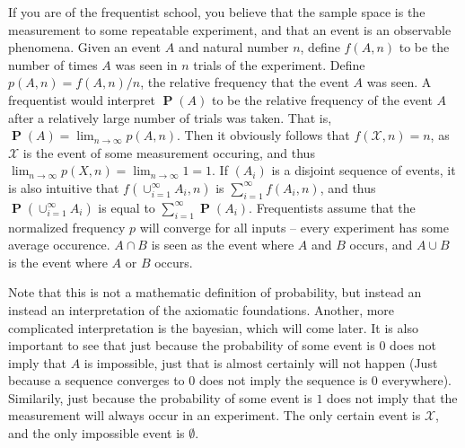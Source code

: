 \documentclass{report}
\DeclareMathOperator{\prob}{\mathbf{P}}
\begin{document}
If you are of the frequentist school, you believe that the sample space is the measurement to some repeatable experiment, and that an event is an observable phenomena. Given an event $A$ and natural number $n$, define $f(A,n)$ to be the number of times $A$ was seen in $n$ trials of the experiment. Define $p(A,n) = f(A,n)/n$, the relative frequency that the event $A$ was seen. A frequentist would interpret $\prob(A)$ to be the relative frequency of the event $A$ after a relatively large number of trials was taken. That is, $\prob(A) = \lim_{n \to \infty}p(A,n)$. Then it obviously follows that $f(\mathcal{X}, n) = n$, as $\mathcal{X}$ is the event of some measurement occuring, and thus $\lim_{n \to \infty}p(X,n) = \lim_{n \to \infty} 1 = 1$. If $(A_i)$ is a disjoint sequence of events, it is also intuitive that $f(\cup_{i = 1}^\infty A_i, n)$ is $\sum_{i=1}^\infty f(A_i,n)$, and thus $\prob(\cup_{i=1}^\infty A_i)$ is equal to $\sum_{i=1}^\infty \prob(A_i)$. Frequentists assume that the normalized frequency $p$ will converge for all inputs -- every experiment has some average occurence. $A \cap B$ is seen as the event where $A$ and $B$ occurs, and $A \cup B$ is the event where $A$ or $B$ occurs.

Note that this is not a mathematic definition of probability, but instead an instead an interpretation of the axiomatic foundations. Another, more complicated interpretation is the bayesian, which will come later. It is also important to see that just because the probability of some event is $0$ does not imply that $A$ is impossible, just that is almost certainly will not happen (Just because a sequence converges to $0$ does not imply the sequence is $0$ everywhere). Similarily, just because the probability of some event is $1$ does not imply that the measurement will always occur in an experiment. The only certain event is $\mathcal{X}$, and the only impossible event is $\emptyset$.
\end{document}
